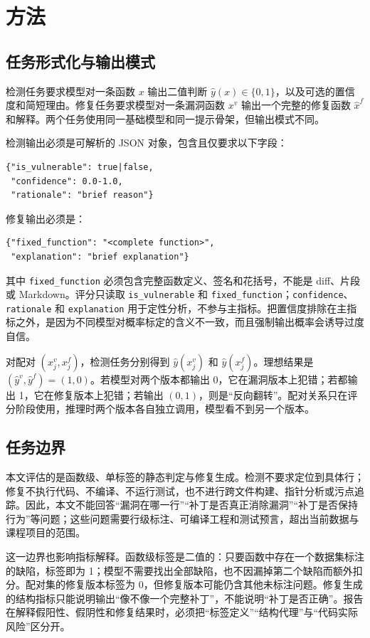 \documentclass[conference]{IEEEtran}
\begin{document}
\section{方法}
\label{sec:methods}

\subsection{任务形式化与输出模式}
检测任务要求模型对一条函数 $x$ 输出二值判断 $\hat{y}(x)\in\{0,1\}$，以及可选的置信度和简短理由。修复任务要求模型对一条漏洞函数 $x^{v}$ 输出一个完整的修复函数 $\hat{x}^{f}$ 和解释。两个任务使用同一基础模型和同一提示骨架，但输出模式不同。

检测输出必须是可解析的 JSON 对象，包含且仅要求以下字段：
\begin{lstlisting}
{"is_vulnerable": true|false,
 "confidence": 0.0-1.0,
 "rationale": "brief reason"}
\end{lstlisting}
修复输出必须是：
\begin{lstlisting}
{"fixed_function": "<complete function>",
 "explanation": "brief explanation"}
\end{lstlisting}
其中 \texttt{fixed\_function} 必须包含完整函数定义、签名和花括号，不能是 diff、片段或 Markdown。评分只读取 \texttt{is\_vulnerable} 和 \texttt{fixed\_function}；\texttt{confidence}、\texttt{rationale} 和 \texttt{explanation} 用于定性分析，不参与主指标。把置信度排除在主指标之外，是因为不同模型对概率标定的含义不一致，而且强制输出概率会诱导过度自信。

对配对 $(x_j^{v},x_j^{f})$，检测任务分别得到 $\hat{y}(x_j^{v})$ 和 $\hat{y}(x_j^{f})$。理想结果是 $(\hat{y}^{v},\hat{y}^{f})=(1,0)$。若模型对两个版本都输出 0，它在漏洞版本上犯错；若都输出 1，它在修复版本上犯错；若输出 $(0,1)$，则是“反向翻转”。配对关系只在评分阶段使用，推理时两个版本各自独立调用，模型看不到另一个版本。

\subsection{任务边界}
本文评估的是函数级、单标签的静态判定与修复生成。检测不要求定位到具体行；修复不执行代码、不编译、不运行测试，也不进行跨文件构建、指针分析或污点追踪。因此，本文不能回答“漏洞在哪一行”“补丁是否真正消除漏洞”“补丁是否保持行为”等问题；这些问题需要行级标注、可编译工程和测试预言，超出当前数据与课程项目的范围。

这一边界也影响指标解释。函数级标签是二值的：只要函数中存在一个数据集标注的缺陷，标签即为 1；模型不需要找出全部缺陷，也不因漏掉第二个缺陷而额外扣分。配对集的修复版本标签为 0，但修复版本可能仍含其他未标注问题。修复生成的结构指标只能说明输出“像不像一个完整补丁”，不能说明“补丁是否正确”。报告在解释假阳性、假阴性和修复结果时，必须把“标签定义”“结构代理”与“代码实际风险”区分开。
\end{document}
